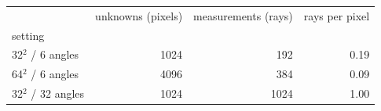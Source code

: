 \begin{tabular}{lrrr}
\toprule
 & unknowns (pixels) & measurements (rays) & rays per pixel \\
setting &  &  &  \\
\midrule
32$^2$ / 6 angles & 1024 & 192 & 0.19 \\
64$^2$ / 6 angles & 4096 & 384 & 0.09 \\
32$^2$ / 32 angles & 1024 & 1024 & 1.00 \\
\bottomrule
\end{tabular}
